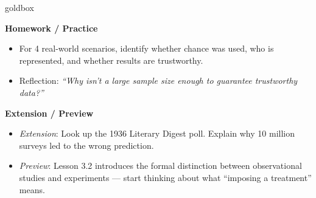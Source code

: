 \documentclass[10pt]{article}
\begin{document}
\begin{skillbox}{goldbox}
\begin{minipage}[t]{0.48\linewidth}
    \textbf{Homework / Practice}
    \begin{itemize}
        \item For 4 real-world scenarios, identify whether chance was used, who is
              represented, and whether results are trustworthy.
        \item Reflection: \textit{``Why isn't a large sample size enough to guarantee
              trustworthy data?''}
    \end{itemize}
\end{minipage}
\hfill
\begin{minipage}[t]{0.48\linewidth}
    \textbf{Extension / Preview}
    \begin{itemize}
        \item \textit{Extension}: Look up the 1936 Literary Digest poll. Explain why
              10 million surveys led to the wrong prediction.
        \item \textit{Preview}: Lesson 3.2 introduces the formal distinction between
              observational studies and experiments --- start thinking about what
              ``imposing a treatment'' means.
    \end{itemize}
\end{minipage}
\end{skillbox}
\end{document}
